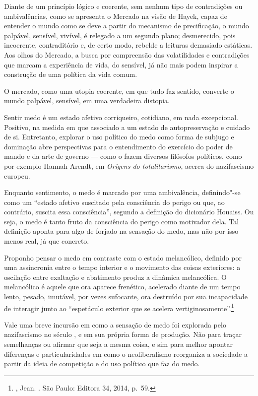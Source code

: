 Diante de um princípio lógico e coerente, sem nenhum tipo de
contradições ou ambivalências, como se apresenta o Mercado na visão de
Hayek, capaz de entender o mundo como se deve a partir do mecanismo de
precificação, o mundo palpável, sensível, vivível, é relegado a um
segundo plano; desmerecido, pois incoerente, contraditório e, de certo
modo, rebelde a leituras demasiado estáticas. Aos olhos do Mercado, a
busca por compreensão das volatilidades e contradições que marcam a
experiência de vida, do sensível, já não mais podem inspirar a
construção de uma política da vida comum.

O mercado, como uma utopia coerente, em que tudo faz sentido, converte o
mundo palpável, sensível, em uma verdadeira distopia.

\asterisc

Sentir medo é um estado afetivo corriqueiro, cotidiano, em nada
excepcional. Positivo, na medida em que associado a um estado de
autopreservação e cuidado de si. Entretanto, explorar o uso político do
medo como forma de subjugo e dominação abre perspectivas para o
entendimento do exercício do poder de mando e da arte de governo --- como o
fazem diversos filósofos políticos, como por exemplo Hannah Arendt, em
\emph{Origens do totalitarismo}, acerca do nazifascismo europeu.

Enquanto sentimento, o medo é marcado por uma ambivalência,
definindo"-se como um ``estado afetivo suscitado pela consciência do
perigo ou que, ao contrário, suscita essa consciência'', segundo a
definição do dicionário Houaiss. Ou seja, o medo é tanto fruto da
consciência do perigo como motivador dela. Tal definição aponta para
algo de forjado na sensação do medo, mas não por isso
menos real, já que concreto.

Proponho pensar o medo em contraste
com o estado melancólico, definido por uma
assincronia entre o tempo interior e o movimento das coisas exteriores:
a oscilação entre exaltação e abatimento produz a dinâmica melancólica.
O melancólico é aquele que ora aparece frenético, acelerado diante de um
tempo lento, pesado, imutável, por vezes sufocante, ora destruído por
sua incapacidade de interagir junto ao ``espetáculo exterior que se
acelera vertiginosamente''.\footnote{, Jean. {}. São Paulo: Editora 34, 2014, p.~59.}

Vale uma breve incursão em como a sensação de medo foi explorada pelo nazifascismo no século , e em sua própria forma de produção. Não para traçar semelhanças ou afirmar que seja a mesma coisa, e sim para melhor apontar diferenças e particularidades em como o neoliberalismo reorganiza a sociedade a partir da ideia de competição e do uso político que faz do medo.

